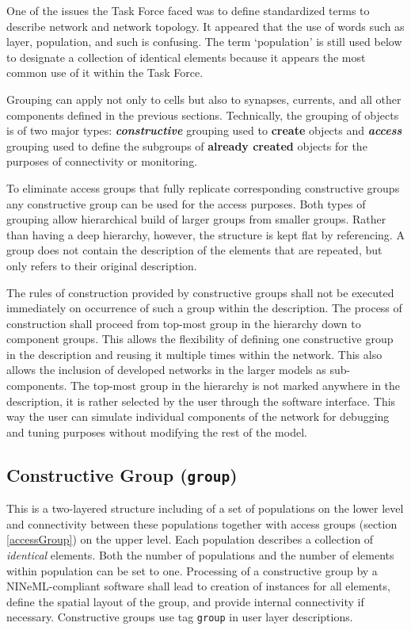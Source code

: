 \documentclass{article}
\begin{document}
One of the issues the Task Force faced was to define standardized terms
to describe network and network topology. It appeared that the use of words
such as layer, population, and such is confusing. The term `population' is
still used below to designate a collection of identical elements because
it appears the most common use of it within the Task Force.

Grouping can apply not only to cells but also to synapses, currents, and all
other components defined in the previous sections. Technically, the grouping of objects
is of two major types: \emph{\bf constructive} grouping used to {\bf create} objects
and \emph{\bf access} grouping used to define the subgroups of {\bf already created}
objects for the purposes of connectivity or monitoring.

To eliminate access groups that fully replicate corresponding constructive groups any
constructive group can be used for the access purposes. Both types of grouping allow
hierarchical build of larger groups from smaller groups. Rather than having a deep
hierarchy, however, the structure is kept flat by referencing. A group does not
contain the description of the elements that are repeated, but only refers to their
original description.

The rules of construction provided by constructive groups shall not be
executed immediately on occurrence of such a group within the description.
The process of construction shall proceed from top-most group in the hierarchy
down to component groups. This allows the flexibility of defining one constructive
group in the description and reusing it multiple times within the network.
This also allows the inclusion of developed networks in the larger models
as sub-components. The top-most group in the hierarchy is not marked anywhere
in the description, it is rather selected by the user through the software
interface. This way the user can simulate individual components of the network
for debugging and tuning purposes without modifying the rest of the model.

\subsection{Constructive Group ({\tt group})}
\label{group}

This is a two-layered structure including of a set of populations on the lower level
and connectivity between these populations together with access groups (section
\ref{accessGroup}) on the upper level. Each population describes a collection of
\emph{identical} elements. Both the number of populations and the number of elements
within population can be set to one. Processing of a constructive group by a
NINeML-compliant software shall lead to creation of instances for all elements,
define the spatial layout of the group, and provide internal connectivity if necessary.
Constructive groups use tag {\tt group} in user layer descriptions.
\end{document}
